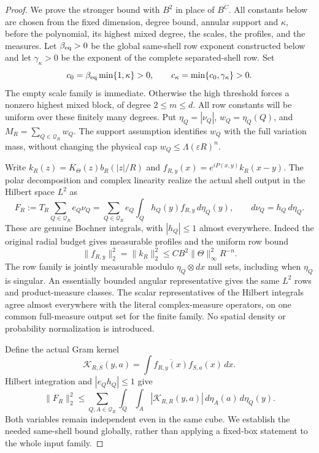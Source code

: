 \documentclass[11pt]{article}
\numberwithin{equation}{section}
\theoremstyle{remark}
\theoremstyle{definition}
\newcommand{\norm}[1]{\lVert #1\rVert}
\begin{document}
\begin{proof}
We prove the stronger bound with $B^2$ in place of $B^C$.
All constants below are chosen from the fixed dimension, degree bound,
annular support and $\kappa$, before the polynomial, its highest mixed
degree, the scales, the profiles, and the measures.  Let
$\beta_{\rm eq}>0$ be the global same-shell row exponent constructed
below and let $\gamma_\kappa>0$ be the exponent of the complete
separated-shell row.  Set
\begin{equation}\label{eq:collective-common-exponent}
 c_0=\beta_{\rm eq}\min\{1,\kappa\}>0,
 \qquad c_\kappa=\min\{c_0,\gamma_\kappa\}>0.
\end{equation}
The empty scale family is immediate.  Otherwise the high threshold
forces a nonzero highest mixed block, of degree $2\le m\le d$.
All row constants will be uniform over these finitely many degrees.
Put $\eta_Q=|\nu_Q|$, $w_Q=\eta_Q(Q)$, and
$M_R=\sum_{Q\in\mathcal Q_R}w_Q$.  The support assumption identifies
$w_Q$ with the full variation mass, without changing the physical
cap $w_Q\le\Lambda(\varepsilon R)^n$.

Write $k_R(z)=K_\Theta(z)b_R(|z|/R)$ and
$f_{R,y}(x)=e^{iP(x,y)}k_R(x-y)$.  The polar decomposition and complex
linearity realize the actual shell output in the Hilbert space $L^2$ as
\begin{equation}\label{eq:collective-polar-sampling}
 F_R:=T_R\sum_{Q\in\mathcal Q_R}e_Q\nu_Q
 =\sum_{Q\in\mathcal Q_R}e_Q
       \int_Q h_Q(y)f_{R,y}\,d\eta_Q(y),
 \qquad d\nu_Q=h_Q\,d\eta_Q.
\end{equation}
These are genuine Bochner integrals, with $|h_Q|\le1$ almost everywhere.
Indeed the original radial budget gives measurable profiles and the
uniform row bound
\begin{equation}\label{eq:collective-atom-L2}
 \norm{f_{R,y}}_2^2=\norm{k_R}_2^2
 \le CB^2\norm\Theta_\infty^2R^{-n}.
\end{equation}
The row family is jointly measurable modulo $\eta_Q\otimes dx$ null
sets, including when $\eta_Q$ is singular.  An essentially bounded
angular representative gives the same $L^2$ rows and product-measure
classes.  The scalar representatives of the Hilbert integrals agree
almost everywhere with the literal complex-measure operators, on one
common full-measure output set for the finite family.  No spatial
density or probability normalization is introduced.

Define the actual Gram kernel
\[
 \mathcal K_{R,S}(y,a)
 =\int\overline{f_{R,y}(x)}f_{S,a}(x)\,dx.
\]
Hilbert integration and $|e_Qh_Q|\le1$ give
\begin{equation}\label{eq:collective-jensen-reduction}
 \norm{F_R}_2^2
 \le\sum_{Q,A\in\mathcal Q_R}\int_Q\int_A
       |\mathcal K_{R,R}(y,a)|\,d\eta_A(a)\,d\eta_Q(y).
\end{equation}
Both variables remain independent even in the same cube.  We establish
the needed same-shell bound globally, rather than applying a fixed-box
statement to the whole input family.


\end{proof}
\end{document}
